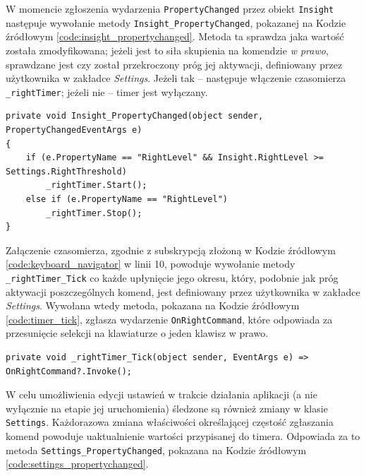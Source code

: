 \documentclass[skorowidz,skroty]{dyplomWEZUT}
\begin{document}
W momencie zgłoszenia wydarzenia \lstinline[language={[Sharp]C}]{PropertyChanged} przez obiekt \lstinline[language={[Sharp]C}]{Insight} następuje wywołanie metody \lstinline[language={[Sharp]C}]{Insight_PropertyChanged}, pokazanej na Kodzie źródłowym \linebreak \vref{code:insight_propertychanged}. Metoda ta sprawdza jaka wartość została zmodyfikowana; jeżeli jest to siła skupienia na komendzie \textit{w prawo}, sprawdzane jest czy został przekroczony próg jej aktywacji, definiowany przez użytkownika w zakładce \textit{Settings}. Jeżeli tak -- następuje włączenie czasomierza \lstinline[language={[Sharp]C}]{_rightTimer}; jeżeli nie -- timer jest wyłączany.

\begin{lstlisting}[language={[Sharp]C}]
private void Insight_PropertyChanged(object sender, PropertyChangedEventArgs e)
{
    if (e.PropertyName == "RightLevel" && Insight.RightLevel >= Settings.RightThreshold)
        _rightTimer.Start();
    else if (e.PropertyName == "RightLevel")
        _rightTimer.Stop();
}
\end{lstlisting}

\vfill

Załączenie czasomierza, zgodnie z subskrypcją złożoną w Kodzie źródłowym \vref{code:keyboard_navigator} w linii 10, powoduje wywołanie metody \lstinline[language={[Sharp]C}]{_rightTimer_Tick} co każde upłynięcie jego okresu, który, podobnie jak próg aktywacji poszczególnych komend, jest definiowany przez użytkownika w zakładce \textit{Settings}. Wywołana wtedy metoda, pokazana na Kodzie źródłowym \vref{code:timer_tick}, zgłasza wydarzenie \lstinline[language={[Sharp]C}]{OnRightCommand}, które odpowiada za przesunięcie selekcji na klawiaturze o jeden klawisz w prawo.

\vfill

\begin{lstlisting}[language={[Sharp]C}]
private void _rightTimer_Tick(object sender, EventArgs e) => OnRightCommand?.Invoke();
\end{lstlisting}

\vfill

W celu umożliwienia edycji ustawień w trakcie działania aplikacji (a nie wyłącznie na etapie jej uruchomienia) śledzone są również zmiany w klasie \lstinline[language={[Sharp]C}]{Settings}. Każdorazowa zmiana właściwości określającej częstość zgłaszania komend powoduje uaktualnienie wartości przypisanej do timera. Odpowiada za to metoda \lstinline[language={[Sharp]C}]{Settings_PropertyChanged}, pokazana na Kodzie źródłowym \vref{code:settings_propertychanged}.
\end{document}
